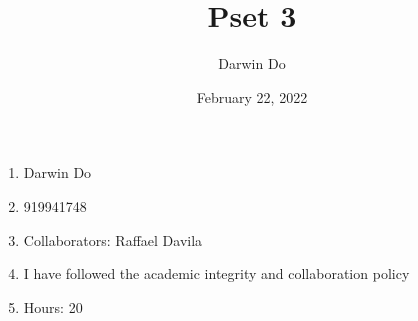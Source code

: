 \documentclass{article}
\title{Pset 3}
\begin{document}
\date{February 22, 2022 }
\author{Darwin Do}

\maketitle

\begin{enumerate}
    \item Darwin Do
    \item 919941748
    \item Collaborators: Raffael Davila
    \item I have followed the academic integrity and collaboration policy
    \item Hours: 20
\end{enumerate}

\newpage
\end{document}
